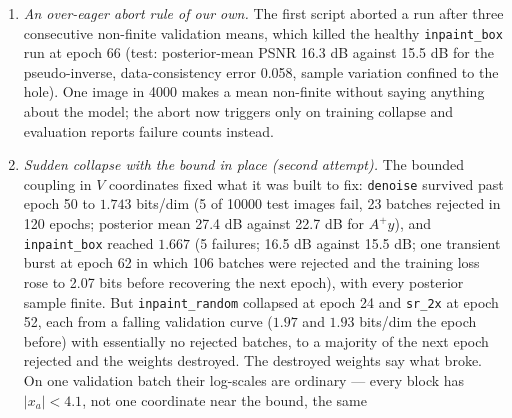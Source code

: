\documentclass[11pt]{article}
\begin{document}
\begin{itemize}
\begin{enumerate}
                pseudo-inverse, so this was not the overflow problem in
                disguise. It is the per-channel-affine limitation of the
                coupling: in pixel coordinates the base is far from diagonal
                for average pooling, the forward pass can still reach a good
                likelihood by using context, but the inverse of such a map on
                base samples that are correlated in a way the coupling
                cannot represent is meaningless. Moving the flow to $V^\top x$
                makes the base diagonal in the coupling's own coordinates.
          \item \emph{An over-eager abort rule of our own.} The first script
                aborted a run after three consecutive non-finite validation
                means, which killed the healthy \texttt{inpaint\_box} run at
                epoch 66 (test: posterior-mean PSNR 16.3 dB against 15.5 dB
                for the pseudo-inverse, data-consistency error 0.058,
                sample variation confined to the hole). One image in 4000
                makes a mean non-finite without saying anything about the
                model; the abort now triggers only on training collapse and
                evaluation reports failure counts instead.
          \item \emph{Sudden collapse with the bound in place (second
                attempt).} The bounded coupling in $V$ coordinates fixed
                what it was built to fix: \texttt{denoise} survived past
                epoch 50 to $1.743$ bits/dim (5 of 10000 test images fail,
                23 batches rejected in 120 epochs; posterior mean 27.4 dB
                against 22.7 dB for $A^{+}y$), and \texttt{inpaint\_box}
                reached $1.667$ (5 failures; 16.5 dB against 15.5 dB; one
                transient burst at epoch 62 in which 106 batches were
                rejected and the training loss rose to 2.07 bits before
                recovering the next epoch), with every posterior sample
                finite. But \texttt{inpaint\_random} collapsed at epoch 24
                and \texttt{sr\_2x} at epoch 52, each from a falling
                validation curve ($1.97$ and $1.93$ bits/dim the epoch
                before) with essentially no rejected batches, to a majority
                of the next epoch rejected and the weights destroyed. The
                destroyed weights say what broke. On one validation batch
                their log-scales are ordinary --- every block has
                $|x_a| < 4.1$, not one coordinate near the bound, the same

\end{enumerate}
\end{itemize}
\end{document}
